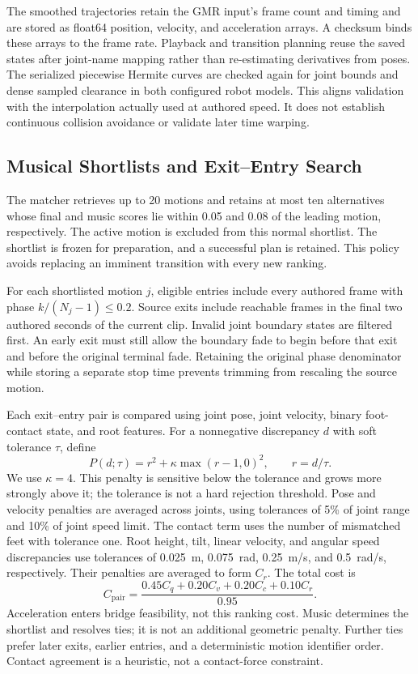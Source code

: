 \documentclass[conference]{IEEEtran}
\begin{document}
The smoothed trajectories retain the GMR input's frame count and timing and
are stored as float64 position, velocity, and acceleration arrays. A checksum binds these arrays to
the frame rate. Playback and transition planning reuse the saved states after
joint-name mapping rather than re-estimating derivatives from poses. The
serialized piecewise Hermite curves are checked again for joint bounds and
dense sampled clearance in both configured robot models. This aligns
validation with the interpolation actually used at authored speed. It does
not establish continuous collision avoidance or validate later time warping.

\subsection{Musical Shortlists and Exit--Entry Search}
\label{sec:pair-search}
The matcher retrieves up to 20 motions and retains at most ten alternatives
whose final and music scores lie within 0.05 and 0.08 of the leading motion,
respectively. The active motion is excluded from this normal shortlist.
The shortlist is frozen for preparation, and a successful plan is retained.
This policy avoids replacing an imminent transition with every new ranking.

For each shortlisted motion $j$, eligible entries include every authored
frame with phase $k/(N_j-1)\leq0.2$. Source exits include reachable frames in
the final two authored seconds of the current clip. Invalid joint boundary
states are filtered first. An early exit must still allow the boundary fade
to begin before that exit and before the original terminal fade. Retaining
the original phase denominator while storing a separate stop time prevents
trimming from rescaling the source motion.

Each exit--entry pair is compared using joint pose, joint velocity, binary
foot-contact state, and root features. For a nonnegative discrepancy $d$ with
soft tolerance $\tau$, define
\begin{equation}
P(d;\tau)=r^2+\kappa\max(r-1,0)^2,\qquad r=d/\tau.
\label{eq:penalty}
\end{equation}
We use $\kappa=4$. This penalty is sensitive below the tolerance and grows more strongly above
it; the tolerance is not a hard rejection threshold. Pose and velocity
penalties are averaged across joints, using tolerances of 5\% of joint range
and 10\% of joint speed limit. The contact term uses the number of mismatched
feet with tolerance one. Root height, tilt, linear velocity, and angular
speed discrepancies use tolerances of 0.025~m, 0.075~rad, 0.25~m/s, and
0.5~rad/s, respectively. Their penalties are averaged to form $C_r$.
The total cost is
\begin{equation}
C_{\mathrm{pair}}=\frac{0.45C_q+0.20C_v+0.20C_c+0.10C_r}{0.95}.
\label{eq:pair-cost}
\end{equation}
Acceleration enters bridge feasibility, not this ranking cost. Music determines
the shortlist and resolves ties; it is not an additional geometric penalty.
Further ties prefer later exits, earlier entries, and a deterministic motion
identifier order. Contact agreement is a heuristic, not a contact-force constraint.
\end{document}
